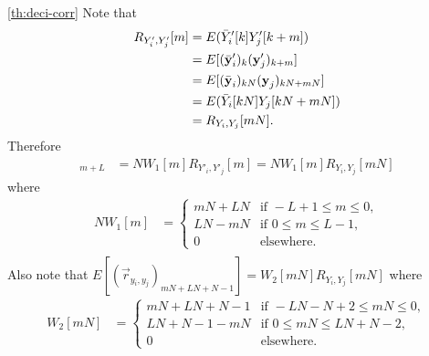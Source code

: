 \documentclass[a4paper, openany, oneside]{memoir}
\begin{document}
\begin{blockProofTheorem}{\ref{th:deci-corr}}
    Note that
    \begin{align*}
        R_{Y'_i,Y'_j}[m]
        &= E(\bar{Y}'_i[k]Y'_j[k+m]) \\
        &= E[(\bar{\boldsymbol{\mathbf{y}}}'_i)_{k}(\boldsymbol{\mathbf{y}}'_j)_{k+m}] \\
        &= E[(\bar{\boldsymbol{\mathbf{y}}}_i)_{kN}(\boldsymbol{\mathbf{y}}_j)_{kN+mN}] \\
        &= E(\bar{Y}_i[kN]Y_j[kN+mN]) \\
        &= R_{Y_i,Y_j}[mN].
    \end{align*}
    Therefore
    \begin{align*}
        [E(N\vec{r}_{y'_i,y'_j})]_{m+L}
        &= N W_1[m] R_{Y'_i,Y'_j}[m]
        = N W_1[m] R_{Y_i,Y_j}[mN]
    \end{align*}
    where
    \begin{align*}
        NW_1[m] &= \begin{cases}
            mN+LN & \text{if } -L+1 \le m \le 0, \\
            LN-mN & \text{if } 0 \le m \le L - 1, \\
            0 & \text{elsewhere}.
        \end{cases} \\
    \end{align*}
    Also note that $E[(\vec{r}_{y_i,y_j})_{mN+LN+N-1}] = W_2[mN] R_{Y_i,Y_j}[mN]$ where
    \begin{align*}
        W_2[mN] &= \begin{cases}
            mN+LN+N-1 & \text{if } -LN-N+2 \le mN \le 0, \\
            LN+N-1-mN& \text{if } 0 \le mN \le LN+N-2, \\
            0 & \text{elsewhere.}

\end{cases}
\end{align*}
\end{blockProofTheorem}
\end{document}
